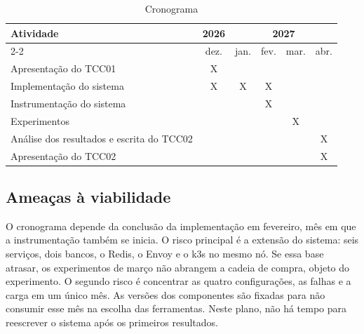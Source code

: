 \begin{table}[htb]
  \centering
  \caption{Cronograma}\label{tab:cronograma}
  \begin{tabular}{lccccc}
    \hline
    Atividade & 2026 & \multicolumn{4}{c}{2027} \\
    \cline{2-2}\cline{3-6}
    & dez. & jan. & fev. & mar. & abr. \\
    \hline
    Apresentação do TCC01 & X &  &  &  &  \\
    Implementação do sistema & X & X & X &  &  \\
    Instrumentação do sistema &  &  & X &  &  \\
    Experimentos &  &  &  & X &  \\
    Análise dos resultados e escrita do TCC02 &  &  &  &  & X \\
    Apresentação do TCC02 &  &  &  &  & X \\
    \hline
  \end{tabular}
  \fonte{}
\end{table}

\subsection{Ameaças à viabilidade}

O cronograma depende da conclusão da implementação em fevereiro, mês em que a instrumentação
também se inicia. O risco principal é a extensão do sistema: seis serviços, dois bancos, o Redis, o
Envoy e o k3s no mesmo nó. Se essa base atrasar, os experimentos de março não abrangem a cadeia de
compra, objeto do experimento. O segundo risco é concentrar as quatro configurações, as falhas e a
carga em um único mês. As versões dos componentes são fixadas para não consumir esse mês na escolha
das ferramentas. Neste plano, não há tempo para reescrever o sistema após os primeiros resultados.
